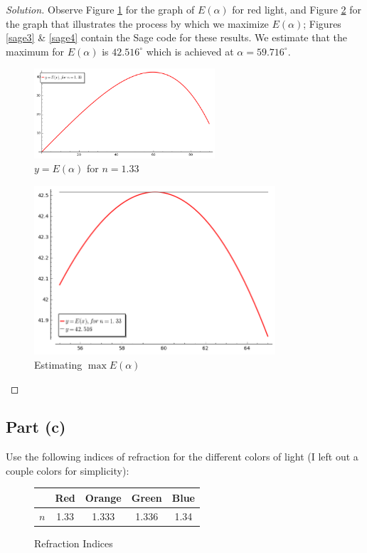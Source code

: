 \documentclass[letterpaper, 12pt]{amsart}
\theoremstyle{definition}  %
\begin{document}
		\begin{proof}[Solution]
		Observe Figure \ref{redGraph} for the graph of $E(\alpha)$ for red light, and Figure \ref{redMax} for the graph that illustrates the process by which we maximize $E(\alpha)$; Figures \ref{sage3} \& \ref{sage4} contain the Sage code for these results.
		We estimate that the maximum for $E(\alpha)$ is $42.516^{\circ}$ which is achieved at $\alpha = 59.716^{\circ}$.
			\begin{figure}[h]
				\includegraphics[width=0.6\textwidth]{figs/c.png}
				\caption{$y = E(\alpha)$ for $n = 1.33$}
				\label{redGraph}
			\end{figure}

			\begin{figure}[h]
				\includegraphics[width=0.8\textwidth]{figs/d.png}
				\caption{Estimating $\max E(\alpha)$}
				\label{redMax}
			\end{figure}
		\end{proof}
		\pagebreak

		\subsection*{Part (c)}
		Use the following indices of refraction for the different colors of light (I left out a couple colors for simplicity):

		\begin{figure}[h]
			\begin{tabular}{c|c|c|c|c}
			& Red & Orange & Green & Blue \\
			\hline
			$n$ & 1.33 & 1.333 & 1.336 & 1.34
			\end{tabular}
			\caption{Refraction Indices}
			\label{refractionIndices}
		\end{figure}
		
\end{document}
